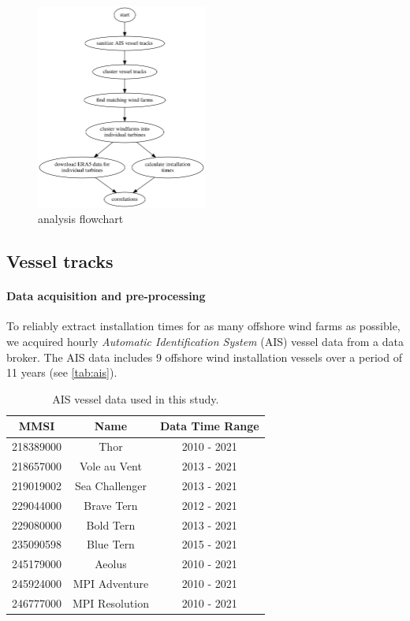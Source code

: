 \documentclass[wes, manuscript]{copernicus}
\begin{document}
\begin{figure}[ht]
	   \centering
	\includegraphics[width=0.5\textwidth]{figures/analysis_flowchart.png}
	\caption{analysis flowchart}
	\label{fig:flowchart}
\end{figure}

\subsection{Vessel tracks}

\paragraph{Data acquisition and pre-processing}

To reliably extract installation times for as many offshore wind farms as possible, 
we acquired hourly \textit{Automatic Identification System} (AIS) vessel data from a 
data broker. The AIS data includes 9 offshore wind installation vessels over a 
period of 11 years (see \autoref{tab:ais}).  

\begin{table}[]
    \caption{AIS vessel data used in this study.}
    \centering
    \begin{tabular}{c c c}
        MMSI & Name & Data Time Range \\
        \hline
        218389000 & Thor & 2010 - 2021 \\
        218657000 & Vole au Vent & 2013 - 2021 \\
        219019002 & Sea Challenger & 2013 - 2021 \\
        229044000 & Brave Tern & 2012 - 2021 \\
        229080000 & Bold Tern & 2013 - 2021 \\
        235090598 & Blue Tern & 2015 - 2021 \\
        245179000 & Aeolus &  2010 - 2021 \\
        245924000 & MPI Adventure & 2010 - 2021 \\
        246777000 & MPI Resolution & 2010 - 2021 \\
    \end{tabular}
    \label{tab:ais}
\end{table}
\end{document}
